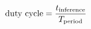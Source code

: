 \documentclass[preview]{standalone}
\begin{document}
\begin{align*}
\special{dvisvgm:raw <g id='unique000'>}\text{duty cycle} = \frac{t_{\text{inference}}}{T_{\text{period}}}\special{dvisvgm:raw </g>}
\end{align*}
\end{document}
